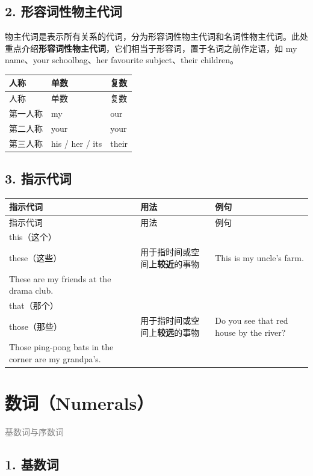 \documentclass[11pt,a4paper]{ctexart}
\begin{document}
\subsection*{2. 形容词性物主代词}

物主代词是表示所有关系的代词，分为形容词性物主代词和名词性物主代词。此处重点介绍\textbf{形容词性物主代词}，它们相当于形容词，置于名词之前作定语，如 my name、your schoolbag、her favourite subject、their children。

{\footnotesize
\begin{longtable}{p{4.47cm}p{4.47cm}p{4.47cm}}
\hline
人称 & 单数 & 复数 \\
\hline
\endfirsthead
\hline
人称 & 单数 & 复数 \\
\hline
\endhead
\hline
\endfoot
第一人称 & my & our \\
第二人称 & your & your \\
第三人称 & his / her / its & their \\
\end{longtable}
}

\subsection*{3. 指示代词}

{\footnotesize
\begin{longtable}{p{4.47cm}p{4.47cm}p{4.47cm}}
\hline
指示代词 & 用法 & 例句 \\
\hline
\endfirsthead
\hline
指示代词 & 用法 & 例句 \\
\hline
\endhead
\hline
\endfoot
this（这个）\\ these（这些） & 用于指时间或空间上\textbf{较近}的事物 & This is my uncle’s farm.\\ These are my friends at the drama club. \\
that（那个）\\ those（那些） & 用于指时间或空间上\textbf{较远}的事物 & Do you see that red house by the river?\\ Those ping-pong bats in the corner are my grandpa’s. \\
\end{longtable}
}

\section{数词（Numerals）}
\noindent\textcolor{gray}{基数词与序数词}\par\smallskip
\subsection*{1. 基数词}
\end{document}
